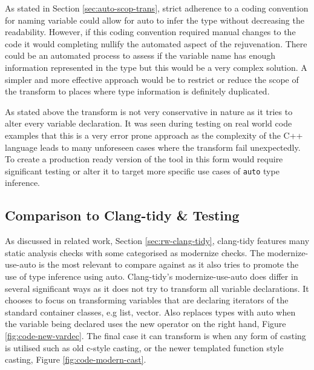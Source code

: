\documentclass[bsc,frontabs,singlespacing,parskip,deptreport]{infthesis}
\begin{document}
As stated in Section \ref{sec:auto-scop-trans}, strict adherence to a coding convention for naming variable could allow for auto to infer the type without decreasing the readability. However, if this coding convention required manual changes to the code it would completing nullify the automated aspect of the rejuvenation. There could be an automated process to assess if the variable name has enough information represented in the type but this would be a very complex solution. A simpler and more effective approach would be to restrict or reduce the scope of the transform to places where type information is definitely duplicated.

As stated above the transform is not very conservative in nature as it tries to alter every variable declaration. It was seen during testing on real world code examples that this is a very error prone approach as the complexity of the C++ language leads to many unforeseen cases where the transform fail unexpectedly. To create a production ready version of the tool in this form would require significant testing or alter it to target more specific use cases of \texttt{auto} type inference.

\subsection{Comparison to Clang-tidy \& Testing }\label{sec:cmp-auto-reju-mod-auto}

As discussed in related work, Section \ref{sec:rw-clang-tidy}, clang-tidy features many static analysis checks with some categorised as modernize checks. The modernize-use-auto \cite{CLANG_AUTO} is the most relevant to compare against as it also tries to promote the use of type inference using auto. Clang-tidy's modernize-use-auto does differ in several significant ways as it does not try to transform all variable declarations. It chooses to focus on transforming variables that are declaring iterators of the standard container classes, e.g list, vector. Also replaces types with auto when the variable being declared uses the new operator on the right hand, Figure \ref{fig:code-new-vardec}. The final case it can transform is when any form of casting is utilised such as old c-style casting, or the newer templated function style casting, Figure \ref{fig:code-modern-cast}.
\end{document}
